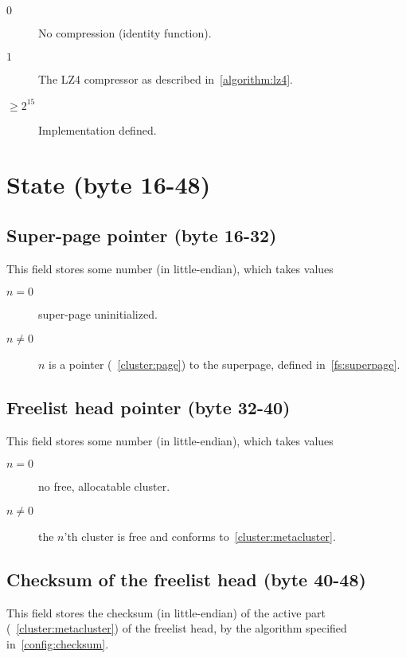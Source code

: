 \documentclass[11pt,a4paper]{report}
\begin{document}
        \begin{description}
            \item [$0$] No compression (identity function).
            \item [$1$] The LZ4 compressor as described
                in~\ref{algorithm:lz4}.
            \item [$\geq 2^{15}$] Implementation defined.
        \end{description}

    \section{State (byte 16-48)}
        \subsection{Super-page pointer (byte 16-32)}
        This field stores some number (in little-endian), which takes values

        \begin{description}
            \item [$n = 0$]    super-page uninitialized.
            \item [$n \neq 0$] $n$ is a pointer (~\ref{cluster:page}) to the
                superpage, defined in~\ref{fs:superpage}.
        \end{description}

        \subsection{Freelist head pointer (byte 32-40)}
        \label{state:freelist_head}
        This field stores some number (in little-endian), which takes values

        \begin{description}
            \item [$n = 0$]    no free, allocatable cluster.
            \item [$n \neq 0$] the $n$'th cluster is free and conforms
                to~\ref{cluster:metacluster}.
        \end{description}

        \subsection{Checksum of the freelist head (byte 40-48)}
        This field stores the checksum (in little-endian) of the active part
        (~\ref{cluster:metacluster}) of the freelist head, by the algorithm
        specified in~\ref{config:checksum}.
\end{document}
